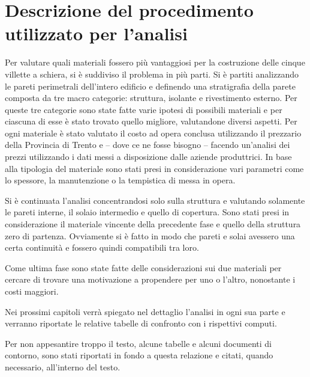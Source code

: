 \section{Descrizione del procedimento utilizzato per l'analisi}
Per valutare quali materiali fossero più vantaggiosi per la costruzione delle cinque villette a schiera, si è suddiviso il problema in più parti.
Si è partiti analizzando le pareti perimetrali dell'intero edificio e definendo una stratigrafia della parete composta da tre macro categorie: struttura, isolante e rivestimento esterno.
Per queste tre categorie sono state fatte varie ipotesi di possibili materiali e per ciascuna di esse è stato trovato quello migliore, valutandone diversi aspetti. 
Per ogni materiale è stato valutato il costo ad opera conclusa utilizzando il prezzario della Provincia di Trento e -- dove ce ne fosse bisogno -- facendo un'analisi dei prezzi utilizzando i dati messi a disposizione dalle aziende produttrici.
In base alla tipologia del materiale sono stati presi in considerazione vari parametri come lo spessore, la manutenzione o la tempistica di messa in opera.

Si è continuata l'analisi concentrandosi solo sulla  struttura e valutando solamente le pareti interne, il solaio intermedio e quello di copertura.
Sono stati presi in considerazione il materiale vincente della precedente fase e quello della struttura zero di partenza.
Ovviamente si è fatto in modo che pareti e solai avessero una certa continuità e fossero quindi compatibili tra loro.

Come ultima fase sono state fatte delle considerazioni sui due materiali per cercare di trovare una motivazione a propendere per uno o l'altro, nonostante i costi maggiori. 

Nei prossimi capitoli verrà spiegato nel dettaglio l'analisi in ogni sua parte e verranno riportate le relative tabelle di confronto con i rispettivi computi.

Per non appesantire troppo il testo, alcune tabelle e alcuni documenti di contorno, sono stati riportati in fondo a questa relazione e citati, quando necessario, all'interno del testo.